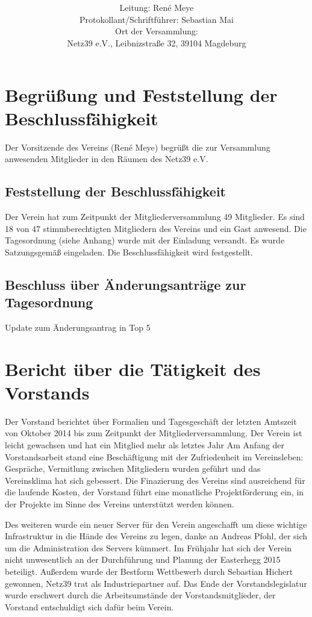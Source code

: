 \documentclass[a4paper,12pt,titlepage]{scrartcl}
\title{ \logo \\ \vspace{0.2\baselineskip} \thetitle}
\author{
Leitung: René Meye\\
Protokollant/Schriftführer: Sebastian Mai \\
Ort der Versammlung:\\ Netz39 e.V., Leibnizstraße 32, 39104 Magdeburg \\
}
\date{\displaydate{date}} %
\begin{document}
\maketitle
\tableofcontents

\clearpage
\section{Begrüßung und Feststellung der Beschlussfähigkeit}
Der Vorsitzende des Vereins (René Meye) begrüßt die zur Versammlung anwesenden Mitglieder in den Räumen des Netz39 e.V.

\subsection{Feststellung der Beschlussfähigkeit}

Der Verein hat zum Zeitpunkt der Mitgliederversammlung 49 Mitglieder. Es sind 18 von 47 stimmberechtigten Mitgliedern des Vereins und ein Gast anwesend. Die Tagesordnung (siehe Anhang) wurde mit der Einladung versandt. Es wurde Satzungsgemäß eingeladen. Die Beschlussfähigkeit wird festgestellt.

\subsection{Beschluss über Änderungsanträge zur Tagesordnung}
Update zum Änderungsantrag in Top 5

\section{Bericht über die Tätigkeit des Vorstands}
Der Vorstand berichtet über Formalien und Tagesgeschäft der letzten Amtszeit von Oktober 2014 bis zum Zeitpunkt der Mitgliederversammlung.
Der Verein ist leicht gewachsen und hat ein Mitglied mehr als letztes Jahr 
Am Anfang der Vorstandsarbeit stand eine Beschäftigung mit der Zufriedenheit im Vereinsleben: Gespräche, Vermitlung zwischen Mitgliedern wurden geführt und das Vereinsklima hat sich gebessert.
Die Finazierung des Vereins sind ausreichend für die laufende Kosten, der Vorstand führt eine monatliche Projektförderung ein, in der Projekte im Sinne des Vereins unterstützt werden können.

Des weiteren wurde ein neuer Server für den Verein angeschafft um diese wichtige Infrastruktur in die Hände des Vereins zu legen, danke an Andreas Pfohl, der sich um die Administration des Servers kümmert.
Im Frühjahr hat sich der Verein nicht unwesentlich an der Durchführung und Planung der Easterhegg 2015 beteiligt. Außerdem wurde der Bestform Wettbewerb durch Sebastian Hichert gewonnen, Netz39 trat als Industriepartner auf.
Das Ende der Vorstandslegislatur wurde erschwert durch die Arbeitsumstände der Vorstandsmitglieder, der Vorstand entschuldigt sich dafür beim Verein.
\end{document}
